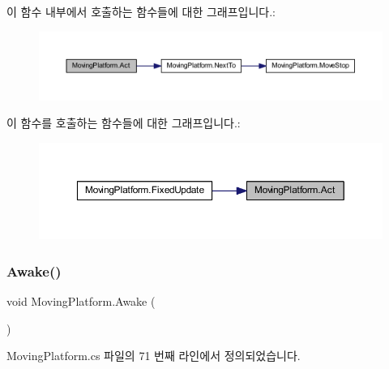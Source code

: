 이 함수 내부에서 호출하는 함수들에 대한 그래프입니다.\+:\nopagebreak
\begin{figure}[H]
\begin{center}
\leavevmode
\includegraphics[width=350pt]{df/d42/class_moving_platform_ab4a3f15333f41ba4a3b9bc0227777460_cgraph}
\end{center}
\end{figure}
이 함수를 호출하는 함수들에 대한 그래프입니다.\+:\nopagebreak
\begin{figure}[H]
\begin{center}
\leavevmode
\includegraphics[width=350pt]{df/d42/class_moving_platform_ab4a3f15333f41ba4a3b9bc0227777460_icgraph}
\end{center}
\end{figure}
\mbox{\label{class_moving_platform_aec6412bf79a5d4fdec57da2e3b390b93}} 
\subsubsection{\texorpdfstring{Awake()}{Awake()}}
{\footnotesize\ttfamily void Moving\+Platform.\+Awake (\begin{DoxyParamCaption}{ }\end{DoxyParamCaption})\hspace{0.3cm}{\ttfamily [private]}}



Moving\+Platform.\+cs 파일의 71 번째 라인에서 정의되었습니다.


\begin{DoxyCode}{0}

\end{DoxyCode}
\mbox{\label{class_moving_platform_a935710333a3a0f0164dad887e8eb7d1c}} 
